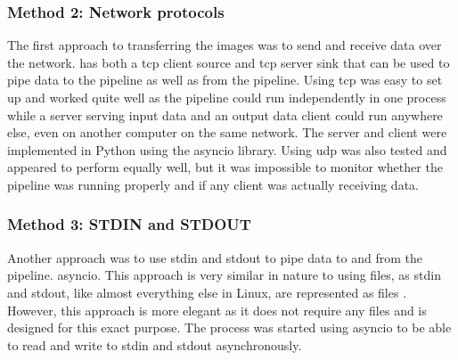 \subsubsection{Method 2: Network protocols}
The first approach to transferring the images was to send and receive data over the network.
\gs has both a \gls{tcp} client source and \gls{tcp} server sink that can be used to pipe data to the pipeline as well as from the pipeline.
Using \gls{tcp} was easy to set up and worked quite well as the pipeline could run independently in one process while a server serving input data and an output data client could run anywhere else, even on another computer on the same network.
The server and client were implemented in Python using the \gls{asyncio} library.
Using \gls{udp} was also tested and appeared to perform equally well, but it was impossible to monitor whether the pipeline was running properly and if any client was actually receiving data.


\subsubsection{Method 3: STDIN and STDOUT}
Another approach was to use \gls{stdin} and \gls{stdout} to pipe data to and from the pipeline.
\gls{asyncio}.
This approach is very similar in nature to using files, as \gls{stdin} and \gls{stdout}, like almost everything else in Linux, are represented as files \cite{mckayWhatAreStdin2020}.
However, this approach is more elegant as it does not require any files and is designed for this exact purpose.
The \gs process was started using \gls{asyncio} to be able to read and write to \gls{stdin} and \gls{stdout} asynchronously.


